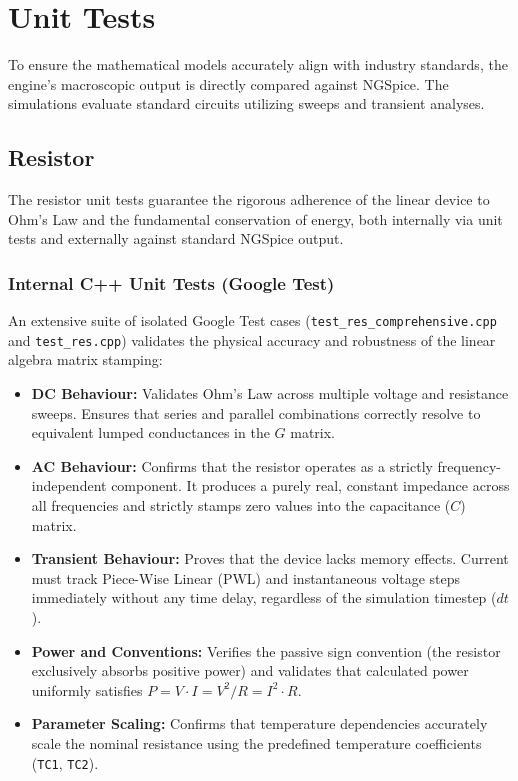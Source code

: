 \section{Unit Tests}
To ensure the mathematical models accurately align with industry standards, the engine's macroscopic output is directly compared against NGSpice. The simulations evaluate standard circuits utilizing sweeps and transient analyses.

\subsection{Resistor}
The resistor unit tests guarantee the rigorous adherence of the linear device to Ohm's Law and the fundamental conservation of energy, both internally via unit tests and externally against standard NGSpice output.

\subsubsection{Internal C++ Unit Tests (Google Test)}
An extensive suite of isolated Google Test cases (\texttt{test\_res\_comprehensive.cpp} and \texttt{test\_res.cpp}) validates the physical accuracy and robustness of the linear algebra matrix stamping:
\begin{itemize}
    \item \textbf{DC Behaviour:} Validates Ohm's Law across multiple voltage and resistance sweeps. Ensures that series and parallel combinations correctly resolve to equivalent lumped conductances in the $G$ matrix.
    \item \textbf{AC Behaviour:} Confirms that the resistor operates as a strictly frequency-independent component. It produces a purely real, constant impedance across all frequencies and strictly stamps zero values into the capacitance ($C$) matrix.
    \item \textbf{Transient Behaviour:} Proves that the device lacks memory effects. Current must track Piece-Wise Linear (PWL) and instantaneous voltage steps immediately without any time delay, regardless of the simulation timestep ($dt$).
    \item \textbf{Power and Conventions:} Verifies the passive sign convention (the resistor exclusively absorbs positive power) and validates that calculated power uniformly satisfies $P = V \cdot I = V^2/R = I^2 \cdot R$.
    \item \textbf{Parameter Scaling:} Confirms that temperature dependencies accurately scale the nominal resistance using the predefined temperature coefficients (\texttt{TC1}, \texttt{TC2}).
\end{itemize}

